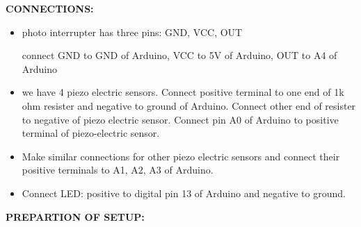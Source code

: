 \documentclass[12pt]{article}
\begin{document}
\vspace{\baselineskip}
{\fontsize{14pt}{16.8pt}\selectfont \textbf{CONNECTIONS:}\par}\par


\vspace{\baselineskip}
\begin{itemize}
	\item {\fontsize{14pt}{16.8pt}\selectfont photo interrupter has three pins: GND, VCC, OUT\par}\par

{\fontsize{14pt}{16.8pt}\selectfont connect GND to GND of Arduino, VCC to 5V of Arduino, OUT to A4 of Arduino\par}\par

	\item {\fontsize{14pt}{16.8pt}\selectfont we have 4 piezo electric sensors. Connect positive terminal to one end of 1k ohm resister and negative to ground of Arduino. Connect other end of resister to negative of piezo electric sensor. Connect pin A0 of Arduino to positive terminal of piezo-electric sensor.\par}\par

	\item {\fontsize{14pt}{16.8pt}\selectfont Make similar connections for other piezo electric sensors and connect their positive terminals to A1, A2, A3 of Arduino.\par}\par

	\item {\fontsize{14pt}{16.8pt}\selectfont Connect LED: positive to digital pin 13 of Arduino and negative to ground.\par}
\end{itemize}\par


\vspace{\baselineskip}

\vspace{\baselineskip}
{\fontsize{14pt}{16.8pt}\selectfont \textbf{PREPARTION OF SETUP:}\par}\par
\end{document}
